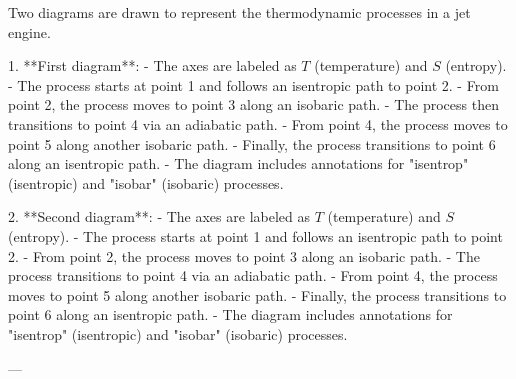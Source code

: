Two diagrams are drawn to represent the thermodynamic processes in a jet engine.  

1. **First diagram**:  
   - The axes are labeled as \( T \) (temperature) and \( S \) (entropy).  
   - The process starts at point 1 and follows an isentropic path to point 2.  
   - From point 2, the process moves to point 3 along an isobaric path.  
   - The process then transitions to point 4 via an adiabatic path.  
   - From point 4, the process moves to point 5 along another isobaric path.  
   - Finally, the process transitions to point 6 along an isentropic path.  
   - The diagram includes annotations for "isentrop" (isentropic) and "isobar" (isobaric) processes.  

2. **Second diagram**:  
   - The axes are labeled as \( T \) (temperature) and \( S \) (entropy).  
   - The process starts at point 1 and follows an isentropic path to point 2.  
   - From point 2, the process moves to point 3 along an isobaric path.  
   - The process transitions to point 4 via an adiabatic path.  
   - From point 4, the process moves to point 5 along another isobaric path.  
   - Finally, the process transitions to point 6 along an isentropic path.  
   - The diagram includes annotations for "isentrop" (isentropic) and "isobar" (isobaric) processes.  

---
